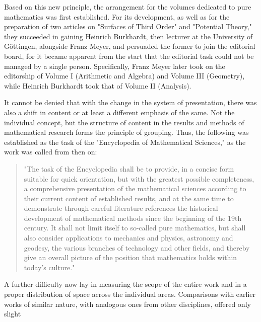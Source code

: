 \thispagestyle{fancy}

\vspace{0.5cm}

Based on this new principle, the arrangement for the volumes dedicated to pure mathematics was first established. For its development, as well as for the preparation of two articles on "Surfaces of Third Order" and "Potential Theory," they succeeded in gaining Heinrich Burkhardt, then lecturer at the University of Göttingen, alongside Franz Meyer, and persuaded the former to join the editorial board, for it became apparent from the start that the editorial task could not be managed by a single person. Specifically, Franz Meyer later took on the editorship of Volume I (Arithmetic and Algebra) and Volume III (Geometry), while Heinrich Burkhardt took that of Volume II (Analysis).

It cannot be denied that with the change in the system of presentation, there was also a shift in content or at least a different emphasis of the same. Not the individual concept, but the structure of content in the results and methods of mathematical research forms the principle of grouping. Thus, the following was established as the task of the "Encyclopedia of Mathematical Sciences," as the work was called from then on:

\begin{quote}
"The task of the Encyclopedia shall be to provide, in a concise form suitable for quick orientation, but with the greatest possible completeness, a comprehensive presentation of the mathematical sciences according to their current content of established results, and at the same time to demonstrate through careful literature references the historical development of mathematical methods since the beginning of the 19th century. It shall not limit itself to so-called pure mathematics, but shall also consider applications to mechanics and physics, astronomy and geodesy, the various branches of technology and other fields, and thereby give an overall picture of the position that mathematics holds within today's culture."
\end{quote}

A further difficulty now lay in measuring the scope of the entire work and in a proper distribution of space across the individual areas. Comparisons with earlier works of similar nature, with analogous ones from other disciplines, offered only slight
